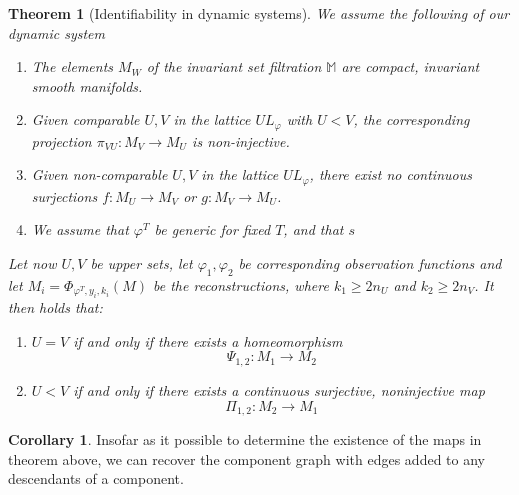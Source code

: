 \documentclass[11pt, a4paper]{memoir}
\theoremstyle{plain}
\newtheorem{thm}{Theorem}
\theoremstyle{definition}
\newtheorem{cor}{Corollary}
\begin{document}
\begin{thm}[Identifiability in dynamic systems]
We assume the following of our dynamic system
\begin{enumerate}[label=\arabic*)]
	\item The elements $M_W$ of the invariant set filtration $\mathbb{M}$ are compact, invariant \emph{smooth} manifolds.
	\item Given comparable $U,V$ in the lattice $UL_\varphi$ with $U<V$, the corresponding projection $\pi_{VU}:M_V\to M_U$ is non-injective.
	\item Given non-comparable $U,V$ in the lattice $UL_\varphi$, there exist no continuous surjections $f:M_U\to M_V$ or $g:M_V\to M_U$.
	\item We assume that $\varphi^T$ be generic for fixed $T$, and that $s$
\end{enumerate}
Let now $U,V$ be upper sets, let $\varphi_1,\varphi_2$ be corresponding observation functions and let $M_i=\Phi_{\varphi^T,y_i,k_i}(M)$ be the reconstructions, where $k_1\geq 2n_U$ and $k_2\geq 2n_V$. It then holds that:
\begin{enumerate}[label=\roman*.]
	\item $U=V$ if and only if there exists a homeomorphism
	$$\Psi_{1,2}:M_1\to M_2$$
	\item $U<V$ if and only if there exists a continuous surjective, noninjective map
	$$\Pi_{1,2}:M_2\to M_1$$ 
\end{enumerate}
\end{thm}

\begin{cor}
Insofar as it possible to determine the existence of the maps in theorem above, we can recover the component graph with edges added to any descendants of a component.
\end{cor}
\end{document}
